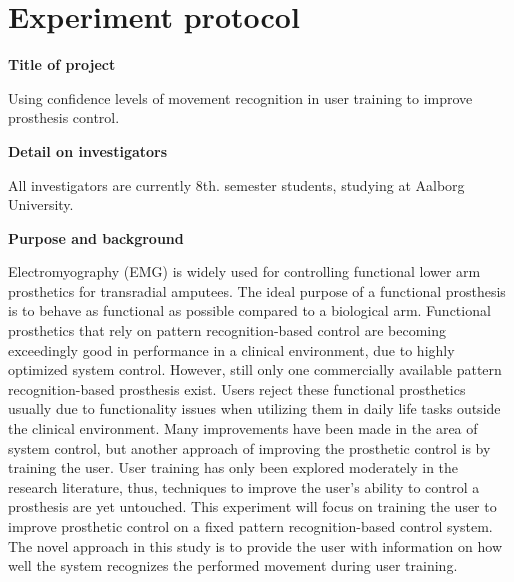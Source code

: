 \section{Experiment protocol}

\textbf{Title of project}

Using confidence levels of movement recognition in user training to improve prosthesis control.

\textbf{Detail on investigators}

All investigators are currently 8th. semester students, studying at Aalborg University.  

\textbf{Purpose and background}

Electromyography (EMG) is widely used for controlling functional lower arm prosthetics for transradial amputees. The ideal purpose of a functional prosthesis is to behave as functional as possible compared to a biological arm. Functional prosthetics that rely on pattern recognition-based control are becoming exceedingly good in performance in a clinical environment, due to highly optimized system control. However, still only one commercially available pattern recognition-based prosthesis exist. Users reject these functional prosthetics usually due to functionality issues when utilizing them in daily life tasks outside the clinical environment. Many improvements have been made in the area of system control, but another approach of improving the prosthetic control is by training the user. User training has only been explored moderately in the research literature, thus, techniques to improve the user's ability to control a prosthesis are yet untouched. This experiment will focus on training the user to improve prosthetic control on a fixed pattern recognition-based control system. The novel approach in this study is to provide the user with information on how well the system recognizes the performed movement during user training. 


